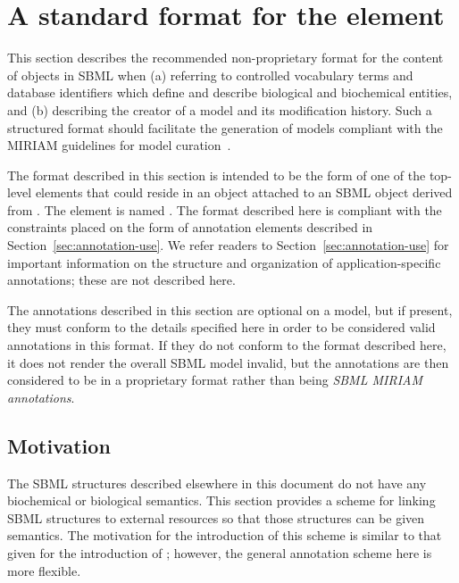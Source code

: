 
\section{A standard format for the  element}
\label{sec:finney-novere}
\label{sec:annotation-standard}

This section describes the recommended non-proprietary format for
the content of \Annotation objects in SBML when (a) referring to
controlled vocabulary terms and database identifiers which define
and describe biological and biochemical entities, and (b)
describing the creator of a model and its modification history.
Such a structured format should facilitate the generation of
models compliant with the MIRIAM guidelines for model
curation~\citep{le_novere:2005}.

The format described in this section is intended to be the form of
one of the top-level elements that could reside in an \Annotation
object attached to an SBML object derived from \SBase.  The
element is named .  The format described here is
compliant with the constraints placed on the form of annotation
elements described in Section~\ref{sec:annotation-use}.  We refer
readers to Section~\ref{sec:annotation-use} for important
information on the structure and organization of
application-specific annotations; these are not described here.

The annotations described in this section are optional on a model,
but if present, they must conform to the details specified here in
order to be considered valid annotations in this format.  If they
do not conform to the format described here, it does not render
the overall SBML model invalid, but the annotations are then
considered to be in a proprietary format rather than being
\emph{SBML MIRIAM annotations}.


\subsection{Motivation}

The SBML structures described elsewhere in this document do not
have any biochemical or biological semantics.  This section
provides a scheme for linking SBML structures to external
resources so that those structures can be given semantics.  The
motivation for the introduction of this scheme is similar to that
given for the introduction of ; however, the
general annotation scheme here is more flexible.

